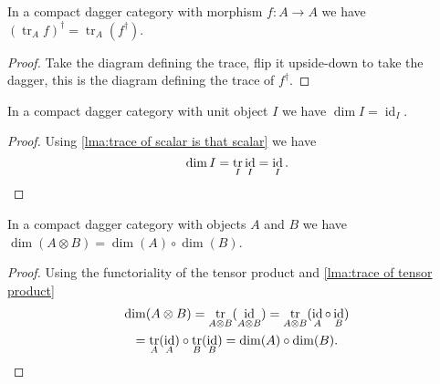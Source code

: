 \documentclass[fleqn]{NotesClass}
\DeclareMathOperator{\id}{id}
\DeclareMathOperator{\tr}{tr}
\begin{document}
    \begin{lma}{}{}
        In a compact dagger category with morphism \(f \colon A \to A\) we have \((\tr_A f)^\dagger = \tr_A(f^\dagger)\).
        \begin{proof}
            Take the diagram defining the trace, flip it upside-down to take the dagger, this is the diagram defining the trace of \(f^\dagger\).
        \end{proof}
    \end{lma}
    
    \begin{lma}{}{}
        In a compact dagger category with unit object \(I\) we have \(\dim I = \id_I\).
        \begin{proof}
            Using \cref{lma:trace of scalar is that scalar} we have
            \begin{equation*}
                \dim I = \tr_I \id_I = \id_I. \qedhere
            \end{equation*}
        \end{proof}
    \end{lma}
    
    \begin{lma}{}{}
        In a compact dagger category with objects \(A\) and \(B\) we have \(\dim(A \otimes B) = \dim(A) \circ \dim(B)\).
        \begin{proof}
            Using the functoriality of the tensor product and \cref{lma:trace of tensor product}
            \begin{multline*}
                \dim(A \otimes B) = \tr_{A \otimes B}(\id_{A \otimes B}) = \tr_{A \otimes B}(\id_A \circ \id_B)\\
                = \tr_A(\id_A) \circ \tr_B(\id_B) = \dim(A) \circ \dim(B). \qedhere
            \end{multline*}
        \end{proof}
    \end{lma}
    
\end{document}

